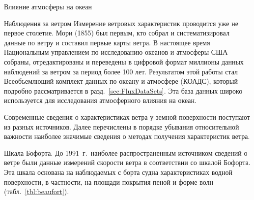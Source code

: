 \begin{chapter}{Влияние атмосферы на океан}
\begin{section}{Наблюдения за ветром}\label{sec:wndmeas}
Измерение ветровых характеристик проводится уже не первое
столетие. Мори (1855) был первым, кто собрал и систематизировал данные
по ветру и составил первые карты ветра. В настоящее время Национальным 
управлением по исследованию океанов и атмосферы США собраны,
отредактированы и переведены в цифровой формат миллионы данных
наблюдений за ветром за период более 100 лет. Результатом этой работы
стал Всеобъемлющий комплект данных по океану и атмосфере (КОАДС),
который подробно рассматривается в разд.~\ref{sec:FluxDataSets}. 
Эта база данных широко используется для исследования атмосферного 
влияния на океан.
%

Современные сведения о характеристиках ветра у земной поверхности
поступают из разных источников. Далее перечислены в порядке убывания
относительной важности наиболее значимые сведения о методах получения
характеристик ветра.
%


\begin{paragraph}{Шкала Бофорта.}
До 1991~г.\ наиболее распространенным источником сведений о ветре были данные
измерений скорости ветра в соответствии со шкалой Бофорта. Эта шкала основана
на наблюдаемых с борта судна характеристиках водной поверхности, в
частности, на площади покрытия пеной и форме волн (табл.~\ref{tbl:beaufort}).
%


\end{paragraph}
\end{section}
\end{chapter}
